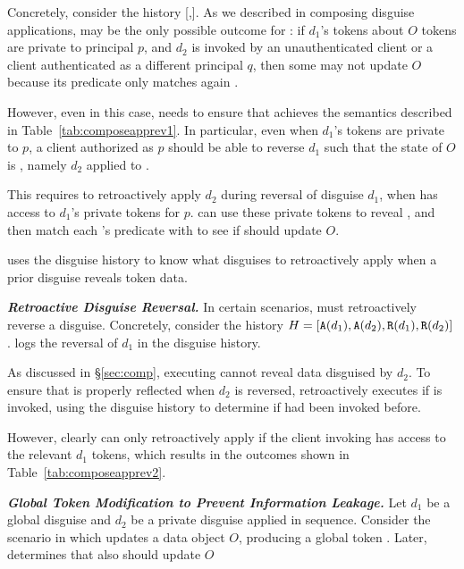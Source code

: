 Concretely, consider the history [,].  As we described in composing disguise
applications, \appcomptwo may be the only possible outcome for : if $d_1$'s tokens
about $O$ tokens are private to principal $p$, and $d_2$ is invoked by an unauthenticated client or
a client authenticated as a different principal $q$, then some  may not update $O$ because
its predicate only matches again \ohist{[\app{d_1}]}.

However, even in this case, \sys needs to ensure that 
achieves the semantics described in Table~\ref{tab:composeapprev1}. In particular, even when $d_1$'s
tokens are private to $p$, a client authorized as $p$ should be able to reverse $d_1$ such that the
state of $O$ is \ohist{[\app{d_2}]}, namely $d_2$ applied to \ostart. 

This requires \sys to retroactively apply $d_2$ during reversal of disguise $d_1$, when \sys has
access to $d_1$'s private tokens for $p$. \sys can use these private tokens to reveal \ostart, and
then match each 's predicate with \ostart to see if  should update $O$.

\sys uses the disguise history to know what disguises to retroactively apply when a prior disguise
reveals token data.

\vspace{6pt}\noindent\textbf{\emph{Retroactive Disguise Reversal.}}
In certain scenarios, \sys must retroactively reverse a disguise. 
Concretely, consider the history $H = [\texttt{A}({d_1}),\texttt{A}({d_2}),\texttt{R}({d_1}),\texttt{R}({d_2})]$.
\sys logs the reversal of $d_1$ in the disguise history. 

As discussed in \S\ref{sec:comp}, executing  cannot reveal data disguised by $d_2$. To
ensure that  is properly reflected when $d_2$ is reversed, \sys retroactively executes
 if  is invoked, using the disguise history to determine if  had been invoked before.

However, clearly \sys can only retroactively apply  if the client invoking  has
access to the relevant $d_1$ tokens, which results in the outcomes shown in
Table~\ref{tab:composeapprev2}.


\vspace{6pt}\noindent\textbf{\emph{Global Token Modification to Prevent Information Leakage.}}
%
Let $d_1$ be a global disguise and $d_2$ be a private disguise applied in sequence.  Consider the
scenario in which  updates a data object $O$, producing a global token . Later,
\sys determines that  also should update $O$ 

